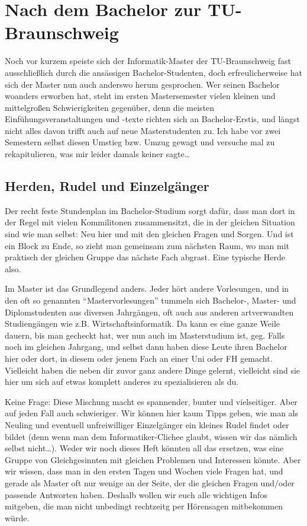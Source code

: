 \section{Nach dem Bachelor zur TU-Braunschweig}

Noch vor kurzem speiste sich der Informatik-Master der TU-Braunschweig fast ausschließlich durch die ansässigen Bachelor-Studenten, doch erfreulicherweise hat sich der Master nun auch anderswo herum gesprochen. Wer seinen Bachelor woanders erworben hat, steht im ersten Mastersemester vielen kleinen und mittelgroßen Schwierigkeiten gegenüber, denn die meisten Einfühungsveranstaltungen und -texte richten sich an Bachelor-Erstis, und längst nicht alles davon trifft auch auf neue Masterstudenten zu. Ich habe vor zwei Semestern selbst diesen Umstieg bzw. Umzug gewagt und versuche mal zu rekapitulieren, was mir leider damals keiner sagte\ldots

\subsection{Herden, Rudel und Einzelgänger}
Der recht feste Stundenplan im Bachelor-Studium sorgt dafür, dass man dort in der Regel mit vielen Kommilitonen zusammensitzt, die in der gleichen Situation sind wie man selbst: Neu hier und mit den gleichen Fragen und Sorgen. Und ist ein Block zu Ende, so zieht man gemeinsam zum nächsten Raum, wo man mit praktisch der gleichen Gruppe das nächste Fach abgrast. Eine typische Herde also.

Im Master ist das Grundlegend anders. Jeder hört andere Vorlesungen, und in den oft so genannten "`Mastervorlesungen"' tummeln sich Bachelor-, Master- und Diplomstudenten aus diversen Jahrgängen, oft auch aus anderen artverwandten Studiengängen wie z.B. Wirtschaftsinformatik. Da kann es eine ganze Weile dauern, bis man gecheckt hat, wer nun auch im Masterstudium ist, geg. Falls noch im gleichen Jahrgang, und selbst dann haben diese Leute ihren Bachelor hier oder dort, in diesem oder jenem Fach an einer Uni oder FH gemacht. Vielleicht haben die neben dir zuvor ganz andere Dinge gelernt, vielleicht sind sie hier um sich auf etwas komplett anderes zu spezialisieren als du.

Keine Frage: Diese Mischung macht es spannender, bunter und vielseitiger. Aber auf jeden Fall auch schwieriger. Wir können hier kaum Tipps geben, wie man als Neuling und eventuell unfreiwilliger Einzelgänger ein kleines Rudel findet oder bildet (denn wenn man dem Informatiker-Clichee glaubt, wissen wir das nämlich selbst nicht\ldots). Weder wir noch dieses Heft könnten all das ersetzen, was eine Gruppe von Gleichgesinnten mit gleichen Problemen und Interessen könnte. Aber wir wissen, dass man in den ersten Tagen und Wochen viele Fragen hat, und gerade als Master oft nur wenige an der Seite, der die gleichen Fragen und/oder passende Antworten haben. Deshalb wollen wir euch alle wichtigen Infos mitgeben, die man nicht unbedingt rechtzeitg per Hörensagen mitbekommen würde.

